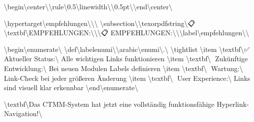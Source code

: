 \textbackslash{}begin\textbackslash{}{center\textbackslash{}}\textbackslash{}rule\textbackslash{}{0.5\textbackslash{}linewidth\textbackslash{}}\textbackslash{}{0.5pt\textbackslash{}}\textbackslash{}end\textbackslash{}{center\textbackslash{}}

\textbackslash{}hypertarget\textbackslash{}{empfehlungen\textbackslash{}}\textbackslash{}{\textbackslash{}%
\textbackslash{}subsection\textbackslash{}{\textbackslash{}texorpdfstring\textbackslash{}{📋 \textbackslash{}textbf\textbackslash{}{EMPFEHLUNGEN:\textbackslash{}}\textbackslash{}}\textbackslash{}{📋 EMPFEHLUNGEN:\textbackslash{}}\textbackslash{}}\textbackslash{}label\textbackslash{}{empfehlungen\textbackslash{}}\textbackslash{}}

\textbackslash{}begin\textbackslash{}{enumerate\textbackslash{}}
\textbackslash{}def\textbackslash{}labelenumi\textbackslash{}{\textbackslash{}arabic\textbackslash{}{enumi\textbackslash{}}.\textbackslash{}}
\textbackslash{}tightlist
\textbackslash{}item
  \textbackslash{}textbf\textbackslash{}{✅ Aktueller Status:\textbackslash{}} Alle wichtigen Links funktionieren
\textbackslash{}item
  \textbackslash{}textbf\textbackslash{}{🎯 Zukünftige Entwicklung:\textbackslash{}} Bei neuen Modulen Labels definieren
\textbackslash{}item
  \textbackslash{}textbf\textbackslash{}{🔄 Wartung:\textbackslash{}} Link-Check bei jeder größeren Änderung
\textbackslash{}item
  \textbackslash{}textbf\textbackslash{}{📱 User Experience:\textbackslash{}} Links sind visuell klar erkennbar
\textbackslash{}end\textbackslash{}{enumerate\textbackslash{}}

\textbackslash{}textbf\textbackslash{}{Das CTMM-System hat jetzt eine vollständig funktionsfähige Hyperlink-Navigation!\textbackslash{}} 🎉
